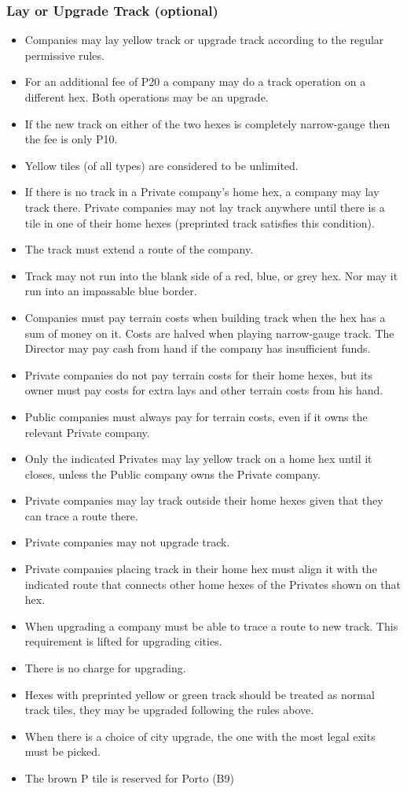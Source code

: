 \documentclass[a4paper,twocolumn]{article}
\begin{document}
\subsubsection{Lay or Upgrade Track (optional)}
\begin{itemize}
	\item Companies may lay yellow track or upgrade track according to the
	regular permissive rules.
	\item For an additional fee of P20 a company may do a track operation on a
	different hex. Both operations may be an upgrade.
	\item If the new track on either of the two hexes is completely narrow-gauge
	then the fee is only P10.
	\item Yellow tiles (of all types) are considered to be unlimited.
	\item If there is no track in a Private company's home hex, a company may
	lay track there. Private companies may not lay track anywhere until there is
	a tile in one of their home hexes (preprinted track satisfies this
	condition).
	\item The track must extend a route of the company.
	\item Track may not run into the blank side of a red, blue, or grey hex. Nor
	may it run into an impassable blue border.
	\item Companies must pay terrain costs when building track when the hex has
	a sum of money on it. Costs are halved when playing narrow-gauge track. The
	Director may pay cash from hand if the company has insufficient funds.
	\item Private companies do not pay terrain costs for their home hexes, but
	its owner must pay costs for extra lays and other terrain costs from his
	hand.
	\item Public companies must always pay for terrain costs, even if it owns
	the relevant Private company.
	\item Only the indicated Privates may lay yellow track on a home hex until
	it closes, unless the Public company owns the Private company.
	\item Private companies may lay track outside their home hexes given that
	they can trace a route there.
	\item Private companies may not upgrade track.
	\item Private companies placing track in their home hex must align it with
	the indicated route that connects other home hexes of the Privates shown on
	that hex.
	\item When upgrading a company must be able to trace a route to new track.
	This requirement is lifted for upgrading cities.
	\item There is no charge for upgrading.
	\item Hexes with preprinted yellow or green track should be treated as
	normal track tiles, they may be upgraded following the rules above.
	\item When there is a choice of city upgrade, the one with the most legal
	exits must be picked.
	\item The brown P tile is reserved for Porto (B9)
\end{itemize}
\end{document}
